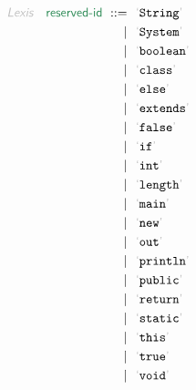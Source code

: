 \begin{align*}
  \KEY{Lexis} \quad
     \SYN{reserved-id}
      \ ::= \ & \
      \LEX{String} \\
      \ \mid \ & \ \LEX{System} \\
      \ \mid \ & \ \LEX{boolean} \\
      \ \mid \ & \ \LEX{class} \\
      \ \mid \ & \ \LEX{else} \\
      \ \mid \ & \ \LEX{extends} \\
      \ \mid \ & \ \LEX{false} \\
      \ \mid \ & \ \LEX{if} \\
      \ \mid \ & \ \LEX{int} \\
      \ \mid \ & \ \LEX{length} \\
      \ \mid \ & \ \LEX{main} \\
      \ \mid \ & \ \LEX{new} \\
      \ \mid \ & \ \LEX{out} \\
      \ \mid \ & \ \LEX{println} \\
      \ \mid \ & \ \LEX{public} \\
      \ \mid \ & \ \LEX{return} \\
      \ \mid \ & \ \LEX{static} \\
      \ \mid \ & \ \LEX{this} \\
      \ \mid \ & \ \LEX{true} \\
      \ \mid \ & \ \LEX{void}
\end{align*}


